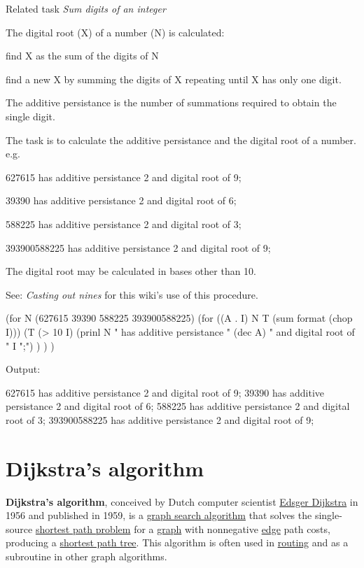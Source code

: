 Related task \emph{Sum digits of an integer}

The digital root (X) of a number (N) is calculated:

find X as the sum of the digits of N

find a new X by summing the digits of X repeating until X has only one
digit.

The additive persistance is the number of summations required to obtain
the single digit.

The task is to calculate the additive persistance and the digital root
of a number. e.g.

627615 has additive persistance 2 and digital root of 9;

39390 has additive persistance 2 and digital root of 6;

588225 has additive persistance 2 and digital root of 3;

393900588225 has additive persistance 2 and digital root of 9;

The digital root may be calculated in bases other than 10.

See: \emph{Casting out nines} for this wiki's use of this procedure.


\begin{wideverbatim}

(for N (627615 39390 588225 393900588225)
   (for ((A . I) N  T  (sum format (chop I)))
      (T (> 10 I)
         (prinl N " has additive persistance " (dec A) " and digital root of " I ";") ) ) )

Output:

627615 has additive persistance 2 and digital root of 9;
39390 has additive persistance 2 and digital root of 6;
588225 has additive persistance 2 and digital root of 3;
393900588225 has additive persistance 2 and digital root of 9;

\end{wideverbatim}

\pagebreak{}
\section*{Dijkstra's algorithm}

\textbf{Dijkstra's algorithm}, conceived by Dutch computer scientist
\href{http://en.wikipedia.org/wiki/Edsger\_Dijkstra}{Edsger Dijkstra} in
1956 and published in 1959, is a
\href{http://en.wikipedia.org/wiki/graph\_search\_algorithm}{graph
search algorithm} that solves the single-source
\href{http://en.wikipedia.org/wiki/shortest\_path\_problem}{shortest
path problem} for a
\href{http://en.wikipedia.org/wiki/graph\_(mathematics)}{graph} with
nonnegative
\href{http://en.wikipedia.org/wiki/edge\_(graph\_theory)}{edge} path
costs, producing a
\href{http://en.wikipedia.org/wiki/shortest\_path\_tree}{shortest path
tree}. This algorithm is often used in
\href{http://en.wikipedia.org/wiki/routing}{routing} and as a subroutine
in other graph algorithms.

